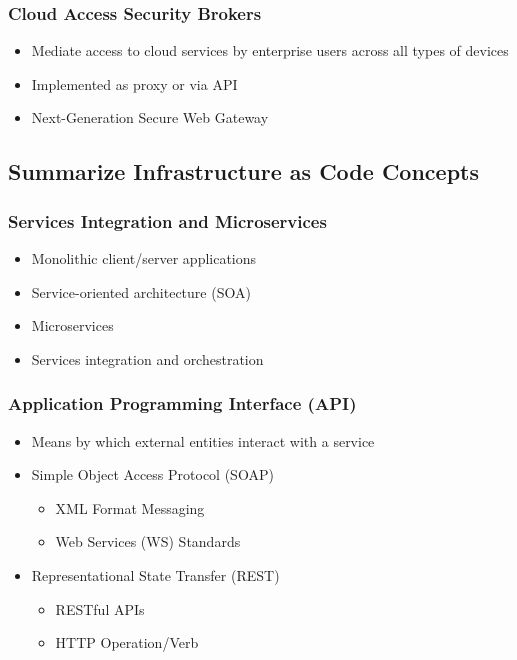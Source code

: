 		\subsubsection {Cloud Access Security Brokers}
			\begin{itemize}
				\item Mediate access to cloud services by enterprise users across all types
					of devices
				\item Implemented as proxy or via API
				\item Next-Generation Secure Web Gateway
			\end{itemize}
	\subsection {Summarize Infrastructure as Code Concepts}
		\subsubsection {Services Integration and Microservices}
			\begin{itemize}
				\item Monolithic client/server applications
				\item Service-oriented architecture (SOA)
				\item Microservices
				\item Services integration and orchestration
			\end{itemize}
		\subsubsection {Application Programming Interface (API)}
			\begin{itemize}
				\item Means by which external entities interact with a service
				\item Simple Object Access Protocol (SOAP)
					\begin{itemize}
						\item XML Format Messaging
						\item Web Services (WS) Standards
					\end{itemize}
				\item Representational State Transfer (REST)
					\begin{itemize}
						\item RESTful APIs
						\item HTTP Operation/Verb
					\end{itemize}
			\end{itemize}
